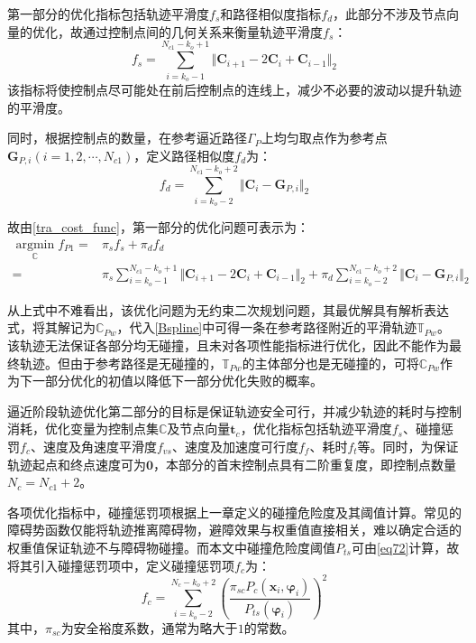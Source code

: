 \documentclass[lang=chs, degree=master, blindreview=false, winfonts=true]{yanputhesis}
\begin{document}
第一部分的优化指标包括轨迹平滑度$f_{s}$和路径相似度指标$f_{d}$，此部分不涉及节点向量的优化，故通过控制点间的几何关系来衡量轨迹平滑度$f_{s}$\cite{zhijiezhuConvexOptimizationApproach2015}：
\begin{equation}
	\label{smooth}
	f_{s}=\sum_{i=k_{o}-1}^{N_{c1}-k_{o}+1}\Vert\boldsymbol{C}_{i+1}-2 \boldsymbol{C}_i+\boldsymbol{C}_{i-1}\Vert_2
\end{equation}
该指标将使控制点尽可能处在前后控制点的连线上，减少不必要的波动以提升轨迹的平滑度。

同时，根据控制点的数量，在参考逼近路径$\Gamma_{P}$上均匀取点作为参考点$\boldsymbol{G}_{P,i}(i=1,2,\cdots,N_{c1})$，定义路径相似度$f_{d}$为：
\begin{equation}
	f_{d}=\sum_{i=k_{o}-2}^{N_{c1}-k_{o}+2}\Vert \boldsymbol{C}_i-\boldsymbol{G}_{P,i}\Vert_2
\end{equation}

故由\autoref{tra_cost_func}，第一部分的优化问题可表示为：
\begin{equation}
	\begin{aligned}
		\label{proximity_phase1}
		\mathop{\arg\min}\limits_{\mathbb{C}} f_{P1}=&\pi_{s}f_{s}+\pi_{d}f_{d}\\
		=&\pi_{s}\sum_{i=k_{o}-1}^{N_{c1}-k_{o}+1}\Vert\boldsymbol{C}_{i+1}-2 \boldsymbol{C}_i+\boldsymbol{C}_{i-1}\Vert_2+\pi_{d}\sum_{i=k_{o}-2}^{N_{c1}-k_{o}+2}\Vert \boldsymbol{C}_i-\boldsymbol{G}_{P,i}\Vert_2
	\end{aligned}
\end{equation}

从上式中不难看出，该优化问题为无约束二次规划问题，其最优解具有解析表达式，将其解记为$\mathbb{C}_{Pw}$，代入\autoref{Bspline}中可得一条在参考路径附近的平滑轨迹$\mathbb{T}_{Pw}$。该轨迹无法保证各部分均无碰撞，且未对各项性能指标进行优化，因此不能作为最终轨迹。但由于参考路径是无碰撞的，$\mathbb{T}_{Pw}$的主体部分也是无碰撞的，可将$\mathbb{C}_{Pw}$作为下一部分优化的初值以降低下一部分优化失败的概率\cite{zhouRobustRealtimeUAV2020}。

逼近阶段轨迹优化第二部分的目标是保证轨迹安全可行，并减少轨迹的耗时与控制消耗，优化变量为控制点集$\mathbb{C}$及节点向量$\boldsymbol{t}_{c}$，优化指标包括轨迹平滑度$f_{s}$、碰撞惩罚$f_{c}$、速度及角速度平滑度$f_{vs}$、速度及加速度可行度$f_{f}$、耗时$f_{t}$等。同时，为保证轨迹起点和终点速度可为$\boldsymbol{0}$，本部分的首末控制点具有二阶重复度，即控制点数量$N_c=N_{c1}+2$。

各项优化指标中，碰撞惩罚项根据上一章定义的碰撞危险度及其阈值计算。常见的障碍势函数仅能将轨迹推离障碍物，避障效果与权重值直接相关，难以确定合适的权重值保证轨迹不与障碍物碰撞。而本文中碰撞危险度阈值$P_{ts}$可由\autoref{eq72}计算，故将其引入碰撞惩罚项中，定义碰撞惩罚项$f_{c}$为：
\begin{equation}
	\label{collision_cost}
	f_{c}=\sum_{i=k_{o}-2}^{N_c-k_{o}+2}\left(\frac{\pi_{sc} P_c({\boldsymbol{x}}_{i},\boldsymbol{\varphi}_{i})}{P_{ts}(\boldsymbol{\varphi}_{i})}\right)^2
\end{equation}
其中，$\pi_{sc}$为安全裕度系数，通常为略大于$1$的常数。
\end{document}
